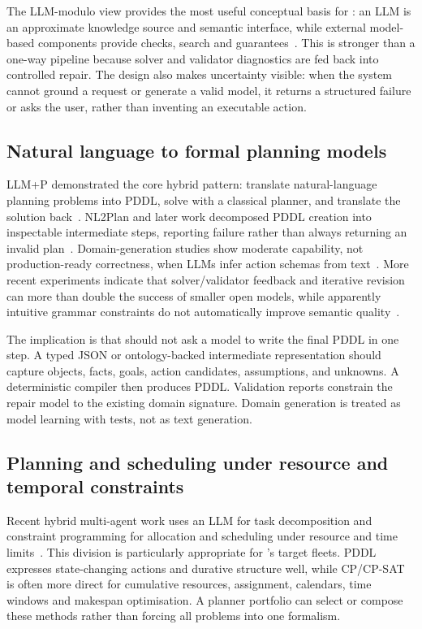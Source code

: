 \documentclass{plan4ari_report}
\begin{document}
The LLM-modulo view provides the most useful conceptual basis for \PlanARI: an LLM is an approximate knowledge source and semantic interface, while external model-based components provide checks, search and guarantees~\cite{kambhampati2024llmmodulo}. This is stronger than a one-way pipeline because solver and validator diagnostics are fed back into controlled repair. The design also makes uncertainty visible: when the system cannot ground a request or generate a valid model, it returns a structured failure or asks the user, rather than inventing an executable action.

\subsection{Natural language to formal planning models}
LLM+P demonstrated the core hybrid pattern: translate natural-language planning problems into PDDL, solve with a classical planner, and translate the solution back~\cite{liu2023llmp}. NL2Plan and later work decomposed PDDL creation into inspectable intermediate steps, reporting failure rather than always returning an invalid plan~\cite{gestrin2024nl2plan}. Domain-generation studies show moderate capability, not production-ready correctness, when LLMs infer action schemas from text~\cite{oswald2024domaingen}. More recent experiments indicate that solver/validator feedback and iterative revision can more than double the success of smaller open models, while apparently intuitive grammar constraints do not automatically improve semantic quality~\cite{kagitha2025challenges}.

The implication is that \PlanARI{} should not ask a model to write the final PDDL in one step. A typed JSON or ontology-backed intermediate representation should capture objects, facts, goals, action candidates, assumptions, and unknowns. A deterministic compiler then produces PDDL. Validation reports constrain the repair model to the existing domain signature. Domain generation is treated as model learning with tests, not as text generation.

\subsection{Planning and scheduling under resource and temporal constraints}
Recent hybrid multi-agent work uses an LLM for task decomposition and constraint programming for allocation and scheduling under resource and time limits~\cite{palmieri2026hybrid}. This division is particularly appropriate for \PlanARI's target fleets. PDDL expresses state-changing actions and durative structure well, while CP/CP-SAT is often more direct for cumulative resources, assignment, calendars, time windows and makespan optimisation. A planner portfolio can select or compose these methods rather than forcing all problems into one formalism.
\end{document}
